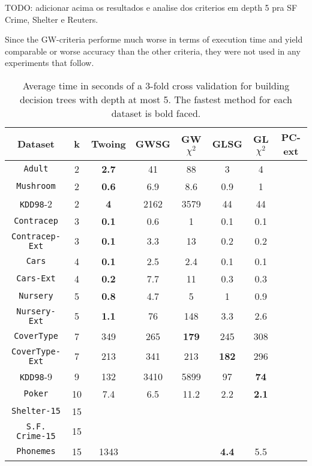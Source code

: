 TODO: adicionar acima os resultados e analise dos criterios em depth 5 pra SF Crime, Shelter e Reuters.

Since the GW-criteria performe much worse in terms of execution time and yield comparable or worse accuracy than the other criteria, they were not used in any experiments that follow.

\begin{table*}[]
\small
\centering
\caption{Average time in seconds of a 3-fold cross validation
for building decision trees with depth at most 5.
The fastest method for each dataset is bold faced.}
\begin{tabular}{c|c|c|c|c|c|c|c}
Dataset & k & Twoing  & GWSG  &         GW$\chi^2$      & GLSG  & GL$\chi^2$ & PC-ext     \\ \hline
{\tt Adult}         & 2 & {\bf  2.7} & 41   & 88   & 3   & 4 &  \\
{\tt Mushroom}      & 2 & {\bf 0.6} & 6.9  & 8.6  & 0.9 & 1  & \\
{\tt KDD98}-2       & 2 & {\bf 4}   & 2162 & 3579 & 44  & 44 & \\
{\tt Contracep}     & 3 & {\bf 0.1} & 0.6  & 1    & 0.1 & 0.1& \\
{\tt Contracep-Ext} & 3 & {\bf 0.1} & 3.3  & 13   & 0.2 & 0.2& \\
{\tt Cars}          & 4 & {\bf 0.1} & 2.5  & 2.4  & 0.1 & 0.1& \\
{\tt Cars-Ext}      & 4 & {\bf 0.2} & 7.7  & 11   & 0.3 & 0.3& \\
{\tt Nursery}       & 5 & {\bf 0.8} & 4.7  & 5    & 1   & 0.9& \\
{\tt Nursery-Ext}   & 5 & {\bf 1.1} & 76  & 148  & 3.3 & 2.6 &  \\
{\tt CoverType}     & 7 & 349 & 265  & {\bf 179}  & 245 & 308& \\
{\tt CoverType-Ext} & 7 & 213 & 341  & 213  & {\bf 182} & 296& \\
{\tt KDD98}-9       & 9 & 132 & 3410 & 5899 & 97  & {\bf 74} & \\ 
{\tt Poker}         & 10 & 7.4 & 6.5 & 11.2 & 2.2  & {\bf 2.1}&\\
{\tt Shelter-15}    & 15 &     &     &      &     & &        \\   
{\tt S.F. Crime-15} & 15 &  & &  & & &       \\ 
{\tt Phonemes}      & 15 & 1343 &  &  & {\bf 4.4}& 5.5 &       
\end{tabular}
\label{tab:time}
\end{table*}



